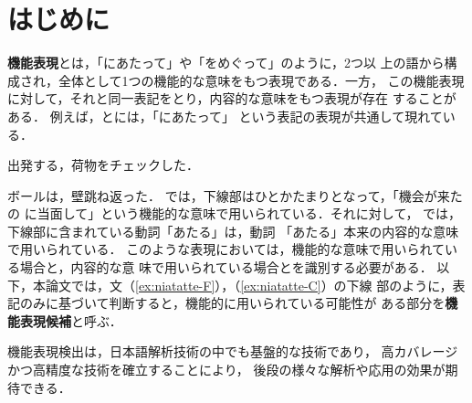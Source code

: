 \documentclass[japanese]{jnlp_1.3e}
\renewcommand{\underline}[1]{}
\begin{document}
\maketitle






\makeatletter
\newenvironment{example}{}{}
\makeatother
\newcommand{\strref}[1]{}
\newcommand{\tabref}[1]{}
\newcommand{\figref}[1]{}
\newcommand{\eqnref}[1]{}



\section{はじめに}\label{sec:intro}

{\bfseries 機能表現}とは，「にあたって」や「をめぐって」のように，2つ以
上の語から構成され，全体として1つの機能的な意味をもつ表現である．一方，
この機能表現に対して，それと同一表記をとり，内容的な意味をもつ表現が存在
することがある．
例えば，\strref{ex:niatatte-F}と\strref{ex:niatatte-C}には，「にあたって」
という表記の表現が共通して現れている．
\begin{example}
  \item 出発する\underline{にあたって}，荷物をチェックした．\label{ex:niatatte-F}
  \item ボールは，壁\underline{にあたって}跳ね返った．\label{ex:niatatte-C}
\end{example}
\strref{ex:niatatte-F}では，下線部はひとかたまりとなって，「機会が来たの
に当面して」という機能的な意味で用いられている．それに対して，
\strref{ex:niatatte-C}では，下線部に含まれている動詞「あたる」は，動詞
「あたる」本来の内容的な意味で用いられている．
このような表現においては，機能的な意味で用いられている場合と，内容的な意
味で用いられている場合とを識別する必要がある\cite{日本語複合辞用例データベースの作成と分析}．
以下，本論文では，文\nobreak{}（\ref{ex:niatatte-F}），（\ref{ex:niatatte-C}）の下線
部のように，表記のみに基づいて判断すると，機能的に用いられている可能性が
ある部分を{\bf 機能表現候補}と呼ぶ．

機能表現検出は，日本語解析技術の中でも基盤的な技術であり，
高カバレージかつ高精度な技術を確立することにより，
後段の様々な解析や応用の効果が期待できる．
\end{document}
